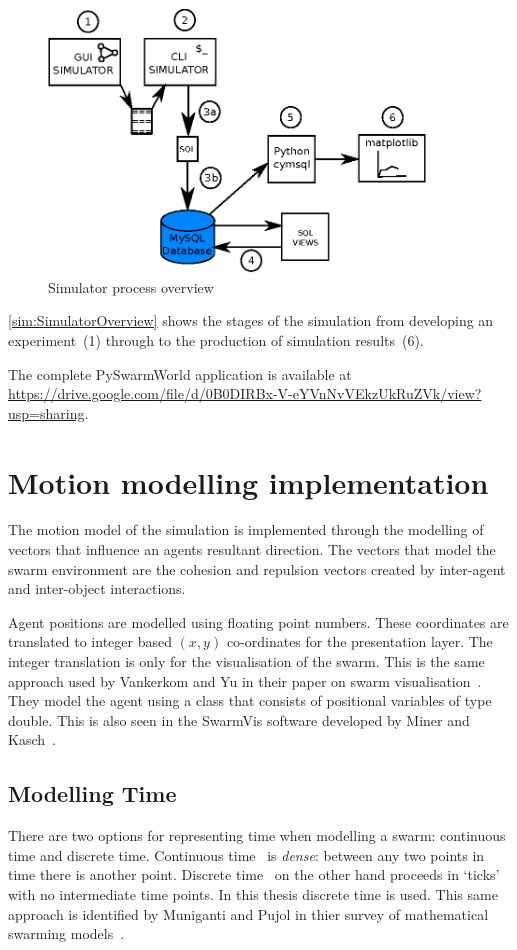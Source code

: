 \begin{figure}[H]
\begin{center}
\includegraphics[width=10cm]{CHAPTER-3/figures/SimulatorProcess}
\end{center}
\caption{Simulator process overview\label{sim:SimulatorOverview}}
\end{figure}

\autoref{sim:SimulatorOverview} shows the stages of the simulation from developing an experiment~(1) through to the production of simulation results~(6).

The complete PySwarmWorld application is available at \url{https://drive.google.com/file/d/0B0DIRBx-V-eYVnNvVEkzUkRuZVk/view?usp=sharing}.

\section{Motion modelling implementation}
The motion model of the simulation is implemented through the modelling of vectors that influence an agents resultant direction. The vectors that model the swarm environment are the cohesion and repulsion vectors created by inter-agent and inter-object interactions. 

Agent positions are modelled using floating point numbers. These coordinates are translated to integer based $(x,y)$ co-ordinates for the presentation layer. The integer translation is only for the visualisation of the swarm. This is the same approach used by Vankerkom and Yu in their paper on swarm visualisation~\cite{VY:04}. They model the agent using a class that consists of positional variables of type double. This is also seen in the SwarmVis software developed by Miner and Kasch~\cite{DMNK:ND}.

\subsection{Modelling Time}\label{sim:time}
There are two options for representing time when modelling a swarm: continuous time and discrete time. Continuous time~\cite{HW:08} is \textit{dense}: between any two points in time there is another point. Discrete time~\cite{FAP:05, GP:05, RVMH:13, HER:11, MP:10, PCL:08a} on the other hand proceeds in `ticks' with no intermediate time points. In this thesis discrete time is used. This same approach is identified by Muniganti and Pujol in thier survey of mathematical swarming models~\cite{MP:10}. 

